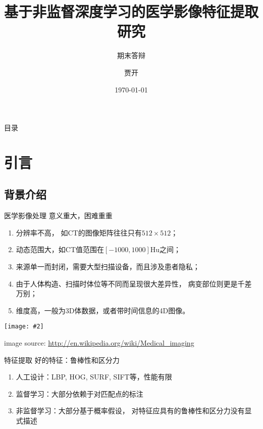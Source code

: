 \documentclass {beamer}
\title{基于非监督深度学习的医学影像特征提取研究}
\subtitle{期末答辩}
\author {贾开}
\institute {清华大学}
\date{\today}
\newcommand{\addgraph}[2]{\begin{center}
\texttt{[image: \#2]}\end{center}}
\begin{document}



\begin{frame}{目录}
    \tableofcontents
\end{frame}

\section{引言}
\subsection{背景介绍}

\begin{frame}{医学影像处理}
    意义重大，困难重重
    \begin{enumerate}
        \item 分辨率不高，
            如CT的图像矩阵往往只有$512\times 512$\cite{medimging2}；
        \item 动态范围大，如CT值范围在$[-1000,1000]$Hu之间\cite{medimging2}；
        \item 来源单一而封闭，需要大型扫描设备，而且涉及患者隐私；
        \item 由于人体构造、扫描时体位等不同而呈现很大差异性，
            病变部位则更是千差万别；
        \item 维度高，一般为3D体数据，或者带时间信息的4D图像。
    \end{enumerate}
    \addgraph{0.3}{res/mi-concept.jpg}
    \tiny{image source:
        \url{http://en.wikipedia.org/wiki/Medical\_imaging}}
\end{frame}

\begin{frame}{特征提取}
    好的特征：\alert{鲁棒性}和\alert{区分力}
    \begin{enumerate}
        \item 人工设计：LBP, HOG, SURF, SIFT等，性能有限
        \item 监督学习：大部分依赖于对匹配点的标注
        \item 非监督学习：大部分基于概率假设，
            对特征应具有的鲁棒性和区分力没有显式描述
    \end{enumerate}
\end{frame}
\end{document}
